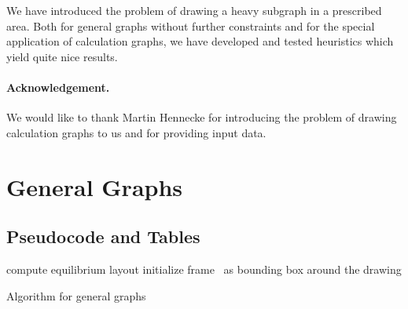 \documentclass[]{llncs}
\begin{document}
We have introduced the problem of drawing a heavy subgraph in
a prescribed area. Both for general graphs without further constraints
and for the special application of calculation graphs, we have
developed and tested heuristics which yield quite nice results.








\paragraph{Acknowledgement.} We would like to thank Martin Hennecke
for introducing the problem of drawing calculation graphs to us and
for providing input data.





\newpage
\appendix
\section{General Graphs}

\subsection{Pseudocode and Tables}
\label{app:gen-tables}

\begin{algorithm}[h]
  compute equilibrium layout\;
  initialize frame~ as bounding box around the drawing\;
	\caption{Algorithm for general graphs}
	\label{alg:general-graphs}
\end{algorithm}
\end{document}
